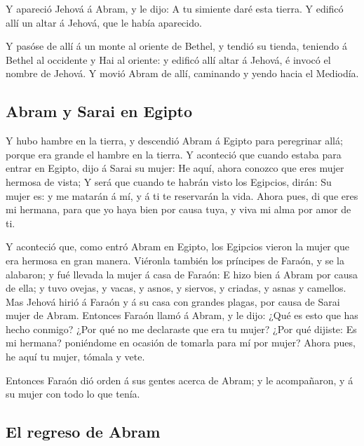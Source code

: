  Y apareció Jehová á Abram, y le dijo: A tu simiente daré
esta tierra. Y edificó allí un altar á Jehová, que le había aparecido.

 Y pasóse de allí á un monte al oriente de Bethel, y
tendió su tienda, teniendo á Bethel al occidente y Hai al oriente: y
edificó allí altar á Jehová, é invocó el nombre de Jehová.
 Y movió Abram de allí, caminando y yendo hacia el
Mediodía.

\hypertarget{abram-y-sarai-en-egipto}{%
\subsection{Abram y Sarai en Egipto}\label{abram-y-sarai-en-egipto}}

 Y hubo hambre en la tierra, y descendió Abram á Egipto
para peregrinar allá; porque era grande el hambre en la tierra.
 Y aconteció que cuando estaba para entrar en Egipto,
dijo á Sarai su mujer: He aquí, ahora conozco que eres mujer hermosa de
vista;  Y será que cuando te habrán visto los Egipcios,
dirán: Su mujer es: y me matarán á mí, y á ti te reservarán la vida.
 Ahora pues, di que eres mi hermana, para que yo haya
bien por causa tuya, y viva mi alma por amor de ti.

 Y aconteció que, como entró Abram en Egipto, los
Egipcios vieron la mujer que era hermosa en gran manera. 
Viéronla también los príncipes de Faraón, y se la alabaron; y fué
llevada la mujer á casa de Faraón:  E hizo bien á Abram
por causa de ella; y tuvo ovejas, y vacas, y asnos, y siervos, y
criadas, y asnas y camellos.  Mas Jehová hirió á Faraón y
á su casa con grandes plagas, por causa de Sarai mujer de Abram.
 Entonces Faraón llamó á Abram, y le dijo: ¿Qué es esto
que has hecho conmigo? ¿Por qué no me declaraste que era tu mujer?
 ¿Por qué dijiste: Es mi hermana? poniéndome en ocasión
de tomarla para mí por mujer? Ahora pues, he aquí tu mujer, tómala y
vete.

 Entonces Faraón dió orden á sus gentes acerca de Abram;
y le acompañaron, y á su mujer con todo lo que tenía.

\hypertarget{el-regreso-de-abram}{%
\subsection{El regreso de Abram}\label{el-regreso-de-abram}}

